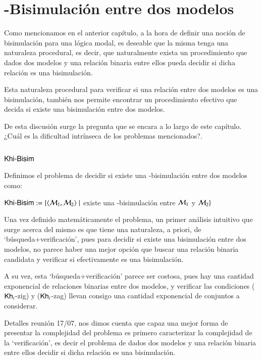 \chapter{\KHilogic-Bisimulación entre dos modelos}

Como mencionamos en el anterior capítulo, a la hora de definir una noción de bisimulación para una lógica modal, 
es deseable que la misma tenga una naturaleza procedural, es decir, que naturalmente exista un procedimiento que dados dos
modelos y una relación binaria entre ellos pueda decidir si dicha relación es una bisimulación.

Esta naturaleza procedural para verificar si una relación entre dos modelos es una bisimulación,
también nos permite encontrar un procedimiento efectivo que decida si existe una bisimulación entre dos modelos.

De esta discusión surge la pregunta que se encara a lo largo de este capítulo. ¿Cuál es la dificultad intrínseca 
de los problemas mencionados?.

\section{$\rm\textsf{Khi-Bisim}$}

\begin{definicion}
    Definimos el problema de decidir si existe una \KHilogic-bisimulación entre dos modelos como:
    \begin{center}
        $\rm\textsf{Khi-Bisim} := \{\langle \mathcal{M}_1,\mathcal{M}_2 \rangle \mid$ existe una \KHilogic-bisimulación
        entre $\mathcal{M}_1$ y $\mathcal{M}_2\}$
    \end{center}
\end{definicion}

Una vez definido matemáticamente el problema, un primer análisis intuitivo que surge acerca
del mismo es que tiene una naturaleza, a priori, de `búsqueda+verificación', pues
para decidir si existe una bisimulación entre dos modelos, no parece haber una mejor
opción que buscar una relación binaria candidata y verificar si efectivamente es una bisimulación. 

A su vez, esta `búsqueda+verificación' parece ser costosa, pues hay una cantidad exponencial de relaciones binarias
entre dos modelos, y verificar las condiciones ($\mathsf{Kh}_i$-zig) y ($\mathsf{Kh}_i$-zag) llevan consigo una cantidad exponencial
de conjuntos a considerar.

Detalles reunión 17/07, nos dimos cuenta que capaz una mejor forma de presentar la complejidad del problema es primero caracterizar
la complejidad de la `verificación', es decir el problema de dados dos modelos y una relación binaria entre ellos decidir si dicha relación es
una bisimulación.

